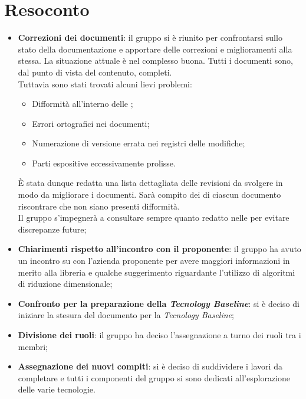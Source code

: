 \section{Resoconto}
\begin{itemize}
\item \textbf{Correzioni dei documenti}: il gruppo si è riunito per confrontarsi sullo stato della documentazione e apportare delle correzioni e miglioramenti alla stessa. La situazione attuale è nel complesso buona. Tutti i documenti sono, dal punto di vista del contenuto, completi.\\
Tuttavia sono stati trovati alcuni lievi problemi:
	\begin{itemize}
		\item Difformità all'interno delle ;
		\item Errori ortografici nei documenti;
		\item Numerazione di versione errata nei registri delle modifiche;
		\item Parti espositive eccessivamente prolisse.
	\end{itemize} 
È stata dunque redatta una lista dettagliata delle revisioni da svolgere in modo da migliorare i documenti. Sarà compito dei  di ciascun documento riscontrare che non siano presenti difformità. \\
Il gruppo s'impegnerà a consultare sempre quanto redatto nelle \NdP per evitare discrepanze future;

\item\textbf{Chiarimenti rispetto all'incontro con il proponente}: il gruppo ha avuto un incontro su  con l'azienda  proponente per avere maggiori informazioni in merito alla libreria  e qualche suggerimento riguardante l'utilizzo di algoritmi di riduzione dimensionale;

\item\textbf{Confronto per la preparazione della \textit{Tecnology Baseline}}: si è deciso di iniziare la stesura del documento per la \textit{Tecnology Baseline};

\item \textbf{Divisione dei ruoli}: il gruppo ha deciso l'assegnazione a turno dei ruoli tra i membri;

\item \textbf{Assegnazione dei nuovi compiti}: si è deciso di suddividere i lavori da completare e tutti i componenti del gruppo si sono dedicati all'esplorazione delle varie tecnologie.
\end{itemize}
\newpage